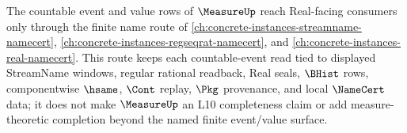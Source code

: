 The countable event and value rows of $\MeasureUp$ reach Real-facing consumers only through the finite name route of \autoref{ch:concrete-instances-streamname-namecert}, \autoref{ch:concrete-instances-regseqrat-namecert}, and \autoref{ch:concrete-instances-real-namecert}. This route keeps each countable-event read tied to displayed StreamName windows, regular rational readback, Real seals, $\BHist$ rows, componentwise $\hsame$, $\Cont$ replay, $\Pkg$ provenance, and local $\NameCert$ data; it does not make $\MeasureUp$ an L10 completeness claim or add measure-theoretic completion beyond the named finite event/value surface.
